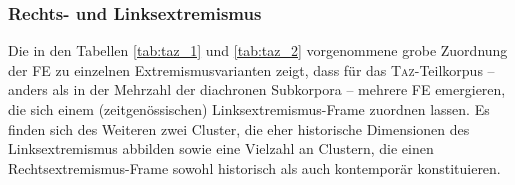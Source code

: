 \subsubsection{Rechts- und Linksextremismus}\label{rechts--und-linksextremismus-8}

Die in den Tabellen \ref{tab:taz_1} und \ref{tab:taz_2} vorgenommene grobe Zuordnung der FE zu einzelnen Extremismusvarianten zeigt, dass für das \textsc{Taz}-Teilkorpus -- anders als in der Mehrzahl der diachronen Subkorpora -- mehrere FE emergieren, die sich einem (zeitgenössischen) Linksextremismus-Frame zuordnen lassen. Es finden sich des Weiteren zwei Cluster, die eher historische Dimensionen des Linksextremismus abbilden sowie eine Vielzahl an Clustern, die einen Rechtsextremismus-Frame sowohl historisch als auch kontemporär konstituieren.

